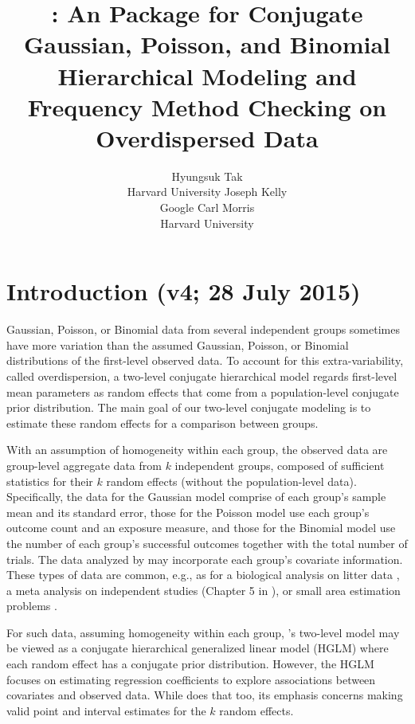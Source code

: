 \documentclass[article]{jss}
\author{Hyungsuk Tak\\Harvard University \And 
             Joseph Kelly\\Google\And
             Carl Morris\\ Harvard University}
\title{\pkg{Rgbp}: An \proglang{R} Package for Conjugate Gaussian, Poisson, and Binomial Hierarchical Modeling and Frequency Method Checking on Overdispersed Data}
\begin{document}

\section[Introduction]{Introduction (v4; 28 July 2015)}
Gaussian, Poisson, or Binomial data from several independent groups sometimes have more variation than the assumed Gaussian, Poisson, or Binomial distributions of the first-level observed data. To account for this extra-variability, called overdispersion, a  two-level conjugate hierarchical model regards first-level mean parameters as random effects that come from a population-level conjugate prior distribution. The main  goal of our two-level conjugate modeling is to estimate these random effects for a comparison between groups.



With an assumption of homogeneity within each group, the observed data are group-level aggregate data from $k$ independent  groups, composed of sufficient statistics for their $k$ random effects (without the population-level data). Specifically, the data for the Gaussian model comprise of each group's sample mean and its standard error, those for the Poisson model use each group's outcome count and an exposure measure, and those for the Binomial model use the number of each group's  successful outcomes together with the total number of trials. The data analyzed by  may incorporate each group's covariate information. These types of  data are common, e.g., as for a biological analysis on litter data \citep{tamura1987stabilized}, a meta analysis on independent studies (Chapter 5 in \cite{gelman2014bayesian}), or small area estimation problems \citep{ghosh1994small, rao2003small}.  

For such data, assuming homogeneity within each group, 's two-level model may be viewed as a conjugate hierarchical generalized linear model (HGLM) \citep{lee1996hierarchical, hglm2006} where each random effect has a conjugate prior distribution.    However, the HGLM focuses on estimating regression coefficients to explore associations between covariates and observed data.   While  does that too, its emphasis concerns making valid point and interval estimates for the $k$ random effects.
\end{document}
